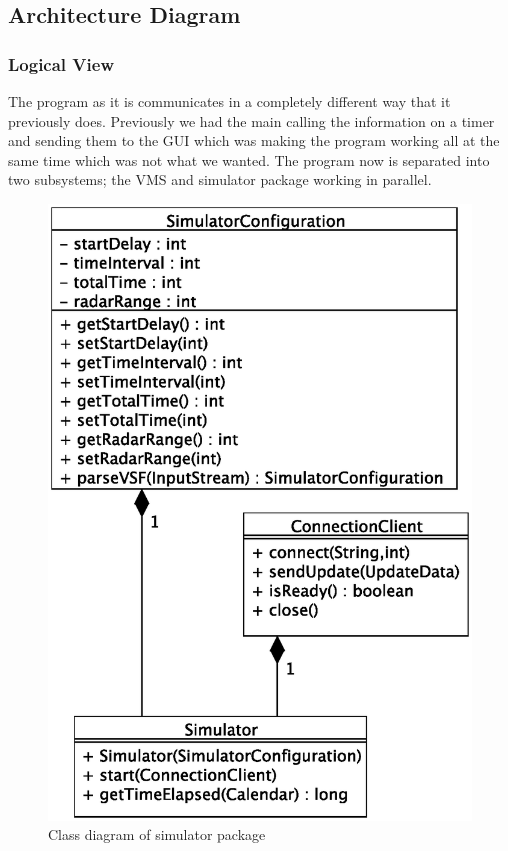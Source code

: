 \documentclass{article}
\begin{document}
\subsection{Architecture Diagram}

\subsubsection{Logical View}

The program as it is communicates in a completely different way that it previously does. Previously we had the main calling the information on a timer and sending them to the GUI which was making the program working all at the same time which was not what we wanted. The program now is separated into two subsystems; the VMS and simulator package working in parallel.

\begin{figure}[h]
\caption{Class diagram of simulator package}
\centering
\includegraphics[scale=0.3]{diagrams/simulator-class-diagram.eps}
\end{figure}
\end{document}
